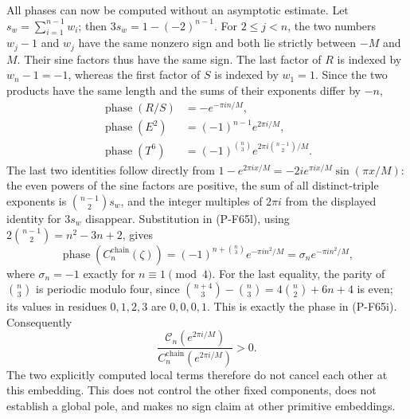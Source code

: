 All phases can now be computed without an asymptotic estimate.
Let $s_w=\sum_{i=1}^{n-1}w_i$; then
$3s_w=1-(-2)^{n-1}$.
For $2\le j<n$, the two numbers $w_j-1$ and $w_j$ have the
same nonzero sign and both lie strictly between $-M$ and $M$.
Their sine factors thus have the same sign.  The last factor
of $R$ is indexed by $w_n-1=-1$, whereas the first factor of
$S$ is indexed by $w_1=1$.  Since the two products have the
same length and the sums of their exponents differ by $-n$,
\[
\begin{split}
 \operatorname{phase}(R/S)&=-e^{-\pi i n/M},\\
 \operatorname{phase}(E^2)&=(-1)^{n-1}e^{2\pi i/M},\\
 \operatorname{phase}(T^6)&=(-1)^{\binom n3}
                              e^{2\pi i\binom{n-1}{2}/M}.
\end{split}                                                    \tag{P-F65m}
\]
The last two identities follow directly from
$1-e^{2\pi ix/M}=-2i e^{\pi ix/M}\sin(\pi x/M)$:
the even powers of the sine factors are positive,
the sum of all distinct-triple exponents is
$\binom{n-1}{2}s_w$, and the integer multiples of $2\pi i$
from the displayed identity for $3s_w$ disappear.
Substitution in (P-F65l), using
$2\binom{n-1}{2}=n^2-3n+2$, gives
\[
 \operatorname{phase}(C_n^{\mathrm{chain}}(\zeta))
                =(-1)^{n+\binom n3}e^{-\pi i n^2/M}
                =\sigma_n e^{-\pi i n^2/M},            \tag{P-F65n}
\]
where $\sigma_n=-1$ exactly for $n\equiv1\pmod4$.
For the last equality, the parity of $\binom n3$ is periodic
modulo four, since
$\binom{n+4}{3}-\binom n3=4\binom n2+6n+4$ is even;
its values in residues $0,1,2,3$ are $0,0,0,1$.
This is exactly the phase in (P-F65i).  Consequently
\[
        \frac{\mathcal C_n(e^{2\pi i/M})}
             {C_n^{\mathrm{chain}}(e^{2\pi i/M})}>0.    \tag{P-F65o}
\]
The two explicitly computed local terms therefore do not cancel
each other at this embedding.  This does not control the other
fixed components, does not establish a global pole, and makes no
sign claim at other primitive embeddings.
